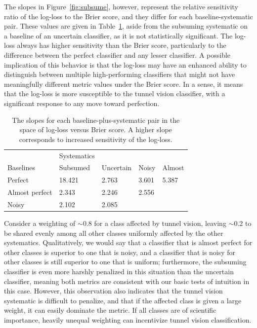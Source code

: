 The slopes in Figure~\ref{fig:subsume}, however, represent the relative sensitivity ratio of the log-loss to the Brier score, and they differ for each baseline-systematic pair.
These values are given in Table~\ref{tab:slopes}, aside from the subsuming systematic on a baseline of an uncertain classifier, as it is not statistically significant.
The log-loss always has higher sensitivity than the Brier score, particularly to the difference between the perfect classifier and any lesser classifier.
A possible implication of this behavior is that the log-loss may have an enhanced ability to distinguish between multiple high-performing classifiers that might not have meaningfully different metric values under the Brier score.
In a sense, it means that the log-loss is more susceptible to the tunnel vision classifier, with a significant response to any move toward perfection.

\begin{table}[]
\begin{tabular}{l|llll}
	& Systematics & & &\\
Baselines & Subsumed & Uncertain & Noisy & Almost\\
\hline
Perfect & 18.421 & 2.763 & 3.601 & 5.387\\
Almost perfect & 2.343 & 2.246 & 2.556 & \\
Noisy & 2.102 & 2.085 & & \\
\end{tabular}
\caption{The slopes for each baseline-plus-systematic pair in the space of log-loss  versus Brier score.
A higher slope corresponds to increased sensitivity of the log-loss.}
\label{tab:slopes}
\end{table}

Consider a weighting of $\sim0.8$ for a class affected by tunnel vision, leaving $\sim0.2$ to be shared evenly among all other classes uniformly affected by the other systematics.
Qualitatively, we would say that a classifier that is almost perfect for other classes is superior to one that is noisy, and a classifier that is noisy for other classes is still superior to one that is uniform; furthermore, the subsuming classifier is even more harshly penalized in this situation than the uncertain classifier, meaning both metrics are  consistent with our basic tests of intuition in this case.
However, this observation also indicates that the tunnel vision systematic is difficult to penalize, and that if the affected class is given a large weight, it can easily dominate the metric.
If all classes are of scientific importance, heavily unequal weighting can incentivize tunnel vision classification.

